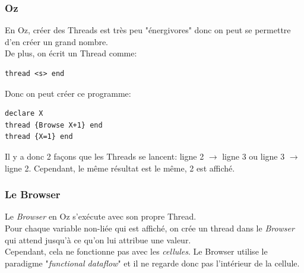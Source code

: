 \documentclass{report}
\begin{document}
\subsubsection{Oz}
En Oz, créer des Threads est très peu "énergivores" donc on peut se permettre d'en créer un grand nombre.\\
De plus, on écrit un Thread comme:
\begin{lstlisting}[escapechar=\%]
thread <s> end
\end{lstlisting}
\noindent
Donc on peut créer ce programme:
\begin{lstlisting}[escapechar=\%]
declare X
thread {Browse X+1} end
thread {X=1} end
\end{lstlisting}
Il y a donc 2 façons que les Threads se lancent: ligne 2 $\rightarrow$ ligne 3 ou ligne 3 $\rightarrow$ ligne 2. Cependant, le même résultat est le même, 2 est affiché.

\subsubsection{Le Browser}
Le \textit{Browser} en Oz s'exécute avec son propre Thread.\\
Pour chaque variable non-liée qui est affiché, on crée un thread dans le \textit{Browser} qui attend jusqu'à ce qu'on lui attribue une valeur.\\
Cependant, cela ne fonctionne pas avec les \textit{cellules}. Le Browser utilise le paradigme  "\textit{functional dataflow}" et il ne regarde donc pas l'intérieur de la cellule.
\end{document}

